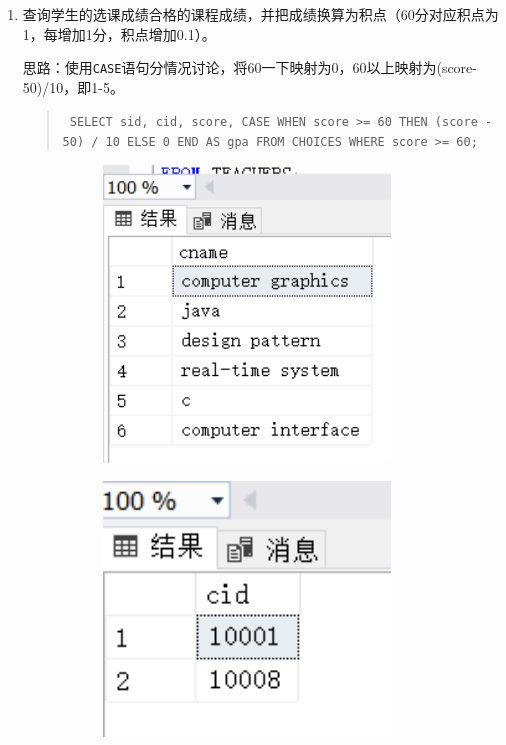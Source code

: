 \documentclass[a4paper,twoside]{article}
\begin{document}
\begin{spacing}{1.2}
\begin{enumerate}
\item 查询学生的选课成绩合格的课程成绩，并把成绩换算为积点（60分对应积点为1，每增加1分，积点增加0.1）。

思路：使用\texttt{CASE}语句分情况讨论，将60一下映射为0，60以上映射为(score-50)/10，即1-5。
\begin{quote}
\texttt{
SELECT sid, cid, score, 
       CASE WHEN score >= 60 THEN (score - 50) / 10 ELSE 0 END AS gpa
FROM CHOICES
WHERE score >= 60;
}
\end{quote}


\begin{figure}[h]
\centering
\caption{运行结果}
\begin{subfigure}{0.3\textwidth}
  \includegraphics[width=0.9\textwidth]{fig3.png}
\end{subfigure}
\begin{subfigure}{0.3\textwidth}
  \includegraphics[width=0.9\textwidth]{fig4.png}
\end{subfigure}
\end{figure}



\end{enumerate}
\end{spacing}
\end{document}
